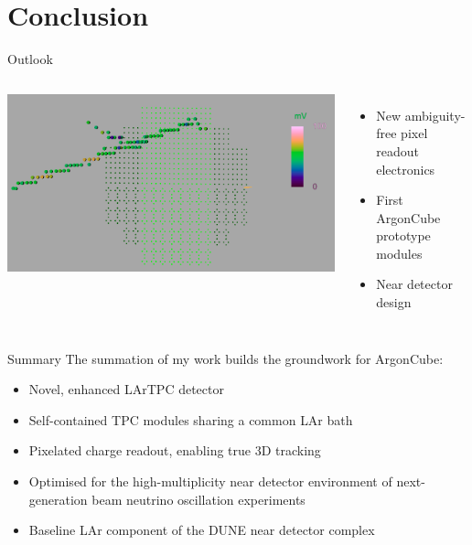 \documentclass[]{beamer}
\newcommand*{\emphcol}{red}
\newcommand*{\AC}{{ArgonCube}}
\newcommand*{\dune}{{DUNE}}
\newcommand*{\lar}{{LAr}}
\newcommand*{\lartpc}{{LArTPC}}
\begin{document}
\section{Conclusion}

\begin{frame}{Outlook}
	\begin{columns}[c]
		\centering
		\includegraphics[width=\textwidth]{defence/larpix_event}
		\begin{itemize}
			\item New ambiguity-free pixel readout electronics
			\item First \AC{} prototype modules
			\item Near detector design
		\end{itemize}
	\end{columns}
\end{frame}

\begin{frame}{Summary}
	The summation of my work builds the groundwork for \AC{}:
	\begin{itemize}
		\item Novel, enhanced \lartpc{} detector
		\item Self-contained TPC modules sharing a common \lar{} bath
		\item Pixelated charge readout, enabling true 3D tracking
		\item Optimised for the high-multiplicity near detector environment of next-generation beam neutrino oscillation experiments
		\item {\color{\emphcol} Baseline \lar{} component of the \dune{} near detector complex}
	\end{itemize}
\end{frame}
\end{document}

